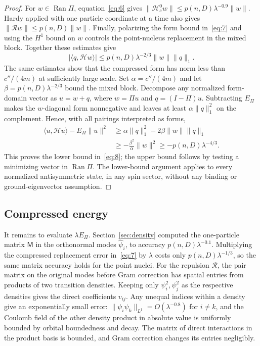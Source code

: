 \begin{proof}
For $w\in\operatorname{Ran}\Pi$, equation~\eqref{eq:6} gives
$\|\mathcal H_c^0w\|\le p(n,D)\lambda^{-0.9}\|w\|$.
Hardy applied with one particle coordinate at a time also gives
$\|\mathcal Rw\|\le p(n,D)\|w\|$. Finally, polarizing the form
bound in~\eqref{eq:7} and using the $H^1$ bound on $w$ controls the
point-nucleus replacement in the mixed block. Together these estimates
give
\[
               |\langle q,\mathcal H w\rangle|
                  \le p(n,D)\lambda^{-2/3}\|w\|\|q\|_1.
\]
The same estimates show that the compressed form has norm less than
$c''/(4m)$ at sufficiently large scale. Set
$\alpha=c''/(4m)$ and let $\beta=p(n,D)\lambda^{-2/3}$ bound the
mixed block. Decompose any normalized form-domain vector as $u=w+q$,
where $w=\Pi u$ and $q=(I-\Pi)u$. Subtracting $E_\Pi$ makes the
$w$-diagonal form nonnegative and leaves at least
$\alpha\|q\|_1^2$ on the complement. Hence, with all pairings
interpreted as forms,
\[
 \begin{split}
 \langle u,\mathcal H u\rangle-E_\Pi\|u\|^2
 &\ge \alpha\|q\|_1^2-2\beta\|w\|\|q\|_1\\
 &\ge -\frac{\beta^2}{\alpha}\|w\|^2
 \ge -p(n,D)\lambda^{-4/3}.
 \end{split}
\]
This proves the lower bound in~\eqref{eq:8}; the upper bound follows by
testing a minimizing vector in $\operatorname{Ran}\Pi$. The lower-bound
argument applies to every normalized antisymmetric state, in any spin
sector, without any binding or ground-eigenvector assumption.
\end{proof}

\subsection{Compressed energy}\label{subsec:compressed-energy}

It remains to evaluate $\lambda E_\Pi$. Section~\ref{sec:density}
computed the one-particle matrix $\mathsf M$ in the orthonormal modes
$\widehat\psi_i$, to accuracy $p(n,D)\lambda^{-0.1}$. Multiplying the
compressed replacement error in~\eqref{eq:7} by $\lambda$ costs only
$p(n,D)\lambda^{-1/3}$, so the same matrix accuracy holds for the
point nuclei.
For the repulsion $\mathcal R$, the pair matrix on the original modes
before Gram correction has spatial entries from products of two
transition densities. Keeping only $\psi_i^2,\psi_j^2$ as the
respective densities gives the direct coefficients $v_{ij}$.
Any unequal indices within a density give an exponentially small error:
$\|\psi_i\psi_k\|_{L^1}=O(\lambda^{-0.8})$ for $i\ne k$, and the
Coulomb field of the other density product in absolute value is
uniformly bounded by orbital boundedness and decay. The matrix of
direct interactions in the product basis is bounded, and Gram
correction changes its entries negligibly.

